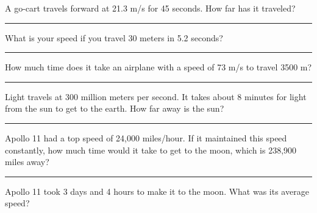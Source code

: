 \documentclass[12pt]{exam}
\begin{document}
\begin{questions}

\Large

\question A go-cart travels forward at 21.3 m/s for 45 seconds.  How far has it traveled?

\vs\hrule\vs

\question What is your speed if you travel 30 meters in 5.2 seconds?

\vs\hrule\vs

\question How much time does it take an airplane with a speed of 73 m/s to travel 3500 m?

\vs\hrule\vs  

\question Light travels at 300 million meters per second.  It takes about 8 minutes for light from the sun to get to the earth.  How far away is the sun?

\vs\hrule\vs  

\question Apollo 11 had a top speed of 24,000 miles/hour.  If it maintained this speed constantly, how much time would it take to get to the moon, which is 238,900 miles away?

\vs\hrule\vs  

\question Apollo 11 took 3 days and 4 hours to make it to the moon.  What was its average speed?

\end{questions}
\end{document}

